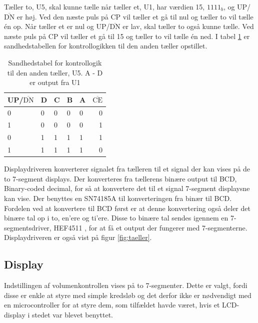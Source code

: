Tæller to, U5, skal kunne tælle når tæller et, U1, har værdien 15, $1111_b$, og UP/$\overline{\mathrm{DN}}$ er høj. Ved den næste puls på CP vil tæller et gå til nul og tæller to vil tælle én op. Når tæller et er nul og UP/$\overline{\mathrm{DN}}$ er lav, skal tæller to også kunne tælle. Ved næste puls på CP vil tæller et gå til 15 og tæller to vil tælle én ned. I tabel \ref{tab:taeller2} er sandhedstabellen for kontrollogikken til den anden tæller opstillet.

\begin{table}[h]
\centering
\begin{tabular}{|l|l|l|l|l||r|}
\hline
UP/$\overline{\mathrm{DN}}$ & D & C & B & A & $\overline{\mathrm{CE}}$ \\ \hline
0 & 0 & 0 & 0 & 0 & 0 \\
1 & 0 & 0 & 0 & 0 & 1 \\
0 & 1 & 1 & 1 & 1 & 1 \\
1 & 1 & 1 & 1 & 1 & 0 \\
\hline
\end{tabular}
\caption{Sandhedstabel for kontrollogik til den anden tæller, U5. A - D er output fra U1}
\label{tab:taeller2}
\end{table}


Displaydriveren konverterer signalet fra tælleren til et signal der kan vises på de to 7-segment displays. Der konverteres fra tællerens binære output til BCD, Binary-coded decimal, for så at konvertere det til et signal 7-segment displaysne kan vise. Der benyttes en SN74185A \cite{sn74185a-datablad} til konverteringen fra binær til BCD. Fordelen ved at konvertere til BCD først er at denne konvertering også deler det binære tal op i to, en'ere og ti'ere. Disse to binære tal sendes igennem en 7-segmentsdriver, HEF4511 \cite{hef4511-datablad}, for at få et output der fungerer med 7-segmenterne. Displaydriveren er også vist på figur \ref{fig:taeller}.

\subsection*{Display}
\label{volumenkontrol-design-display}
Indstillingen af volumenkontrollen vises på to 7-segmenter. Dette er valgt, fordi disse er enkle at styre med simple kredsløb og det derfor ikke er nødvendigt med en microcontroller for at styre dem, som tilfældet havde været, hvis et LCD-display i stedet var blevet benyttet.


